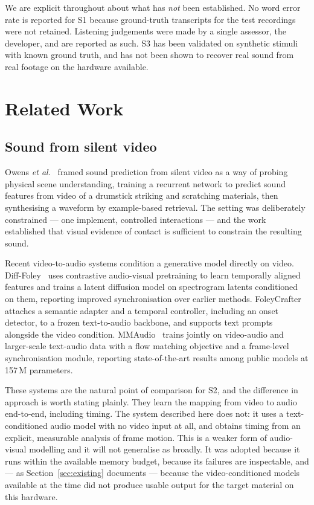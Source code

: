 \documentclass[conference]{IEEEtran}
\begin{document}
We are explicit throughout about what has \emph{not} been established. No word
error rate is reported for S1 because ground-truth transcripts for the test
recordings were not retained. Listening judgements were made by a single
assessor, the developer, and are reported as such. S3 has been validated on
synthetic stimuli with known ground truth, and has not been shown to recover real
sound from real footage on the hardware available.

\section{Related Work}

\subsection{Sound from silent video}

Owens \emph{et al.}~\cite{owens2016} framed sound prediction from silent video as
a way of probing physical scene understanding, training a recurrent network to
predict sound features from video of a drumstick striking and scratching
materials, then synthesising a waveform by example-based retrieval. The setting
was deliberately constrained --- one implement, controlled interactions --- and
the work established that visual evidence of contact is sufficient to constrain
the resulting sound.

Recent video-to-audio systems condition a generative model directly on video.
Diff-Foley~\cite{diffoley2023} uses contrastive audio-visual pretraining to learn
temporally aligned features and trains a latent diffusion model on spectrogram
latents conditioned on them, reporting improved synchronisation over earlier
methods. FoleyCrafter~\cite{foleycrafter2024} attaches a semantic adapter and a
temporal controller, including an onset detector, to a frozen text-to-audio
backbone, and supports text prompts alongside the video condition.
MMAudio~\cite{mmaudio2025} trains jointly on video-audio and larger-scale
text-audio data with a flow matching objective and a frame-level synchronisation
module, reporting state-of-the-art results among public models at 157\,M
parameters.

These systems are the natural point of comparison for S2, and the difference in
approach is worth stating plainly. They learn the mapping from video to audio
end-to-end, including timing. The system described here does not: it uses a
text-conditioned audio model with no video input at all, and obtains timing from
an explicit, measurable analysis of frame motion. This is a weaker form of
audio-visual modelling and it will not generalise as broadly. It was adopted
because it runs within the available memory budget, because its failures are
inspectable, and --- as Section~\ref{sec:existing} documents --- because the
video-conditioned models available at the time did not produce usable output for
the target material on this hardware.
\end{document}
